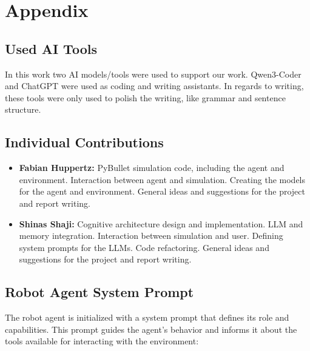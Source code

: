 \documentclass[../report.tex]{subfiles}
\begin{document}
\section*{Appendix}
\label{sec:appendix}

\subsection*{Used AI Tools}
In this work two AI models/tools were used to support our work. Qwen3-Coder and ChatGPT were used as coding and writing assistants. In regards to writing, these tools were only used to polish the writing, like grammar and sentence structure.

\subsection*{Individual Contributions}
\begin{itemize}
	\item \textbf{Fabian Huppertz:} PyBullet simulation code, including the agent and environment. Interaction between agent and simulation. Creating the models for the agent and environment. General ideas and suggestions for the project and report writing.
	\item \textbf{Shinas Shaji:} Cognitive architecture design and implementation. LLM and memory integration. Interaction between simulation and user. Defining system prompts for the LLMs. Code refactoring. General ideas and suggestions for the project and report writing.
\end{itemize}

\subsection*{Robot Agent System Prompt}
The robot agent is initialized with a system prompt that defines its role and capabilities. This prompt guides the agent's behavior and informs it about the tools available for interacting with the environment:
\end{document}
